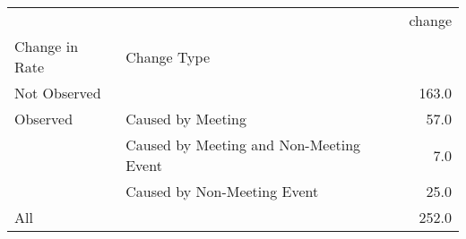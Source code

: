 \begin{tabular}{llr}
\toprule
    &                             &  change \\
Change in Rate & Change Type &         \\
\midrule
Not Observed &                             &   163.0 \\
Observed & Caused by Meeting &    57.0 \\
    & Caused by Meeting and Non-Meeting Event &     7.0 \\
    & Caused by Non-Meeting Event &    25.0 \\
All &                             &   252.0 \\
\bottomrule
\end{tabular}
